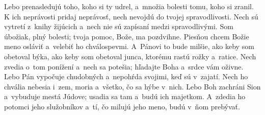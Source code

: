 \versseparator
Lebo prenasledujú toho, koho si ty udrel,
a~množia bolesti tomu, koho si zranil.
\versseparator
K ich neprávosti pridaj neprávosť,
nech nevojdú do tvojej spravodlivosti.
\versseparator
Nech sú vytretí z~knihy žijúcich
a~nech nie sú zapísaní medzi spravodlivými.
\versseparator
Som úbožiak, plný bolesti;
tvoja pomoc, Bože, ma pozdvihne.
\versseparator
Piesňou chcem Božie meno osláviť
a~velebiť ho chválospevmi.
\versseparator
A~Pánovi to bude milšie, ako keby som obetoval býka,
ako keby som obetoval junca, ktorému rastú rožky a~ratice.
\versseparator
Nech zvedia o~tom ponížení a~nech sa potešia;
hľadajte Boha a~srdce vám oživne.
\versseparator
Lebo Pán vypočuje chudobných
a~nepohŕda svojimi, keď sú v~zajatí.
\versseparator
Nech ho chvália nebesia i~zem,
moria a~všetko, čo sa hýbe v~nich.
\versseparator
Lebo Boh zachráni Sion
a~vybuduje mestá Júdove;
\versseparator
usadia sa tam a~budú ich majetkom.
\versseparator
A~zdedia ho potomci jeho služobníkov
a~tí, čo milujú jeho meno, budú v~ňom prebývať.